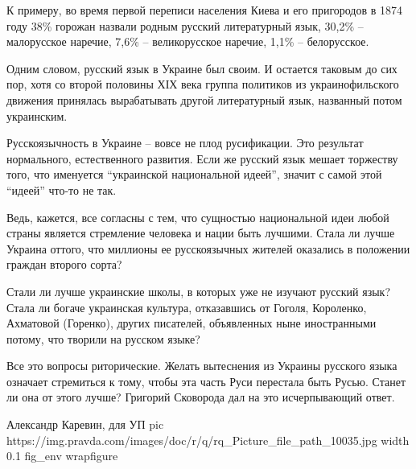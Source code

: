 К примеру, во время первой переписи населения Киева и его пригородов в 1874
году 38\% горожан назвали родным русский литературный язык, 30,2\% – малорусское
наречие, 7,6\% – великорусское наречие, 1,1\% – белорусское.

Одним словом, русский язык в Украине был своим. И остается таковым до сих пор,
хотя со второй половины ХІХ века группа политиков из украинофильского движения
принялась вырабатывать другой литературный язык, названный потом украинским.

Русскоязычность в Украине – вовсе не плод русификации. Это результат
нормального, естественного развития. Если же русский язык мешает торжеству
того, что именуется \enquote{украинской национальной идеей}, значит с самой этой
\enquote{идеей} что-то не так.

Ведь, кажется, все согласны с тем, что сущностью национальной идеи любой страны
является стремление человека и нации быть лучшими. Стала ли лучше Украина
оттого, что миллионы ее русскоязычных жителей оказались в положении граждан
второго сорта?

Стали ли лучше украинские школы, в которых уже не изучают русский язык? Стала
ли богаче украинская культура, отказавшись от Гоголя, Короленко, Ахматовой
(Горенко), других писателей, объявленных ныне иностранными потому, что творили
на русском языке?

Все это вопросы риторические. Желать вытеснения из Украины русского языка
означает стремиться к тому, чтобы эта часть Руси перестала быть Русью. Станет
ли она от этого лучше? Григорий Сковорода дал на это исчерпывающий ответ.

Александр Каревин, для УП
\ifcmt
pic https://img.pravda.com/images/doc/r/q/rq_Picture_file_path_10035.jpg
width 0.1
fig_env wrapfigure
\fi
